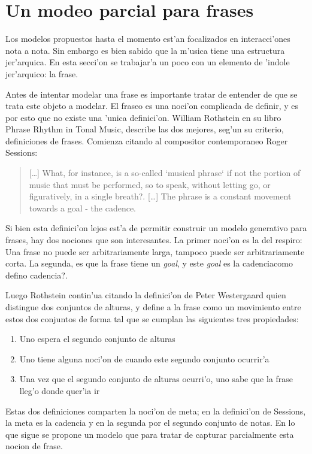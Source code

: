 \section{Un modeo parcial para frases}
\label{sec:phrases}
Los modelos propuestos hasta el momento est'an focalizados en interacci'ones nota a nota. Sin embargo es bien sabido que la m'usica
tiene una estructura jer'arquica. En esta secci'on se trabajar'a un poco con un elemento de 'indole jer'arquico: la frase. 

Antes de intentar modelar una frase es importante tratar de entender de que se trata este objeto a modelar. El fraseo es una
noci'on complicada de definir, y es por esto que no existe una 'unica definici'on. William Rothstein en su libro Phrase Rhythm 
in Tonal Music, describe las dos mejores, seg'un su criterio, definiciones de frases. Comienza citando al compositor contemporaneo
Roger Sessions: 

\begin{quote} 
[\ldots] What, for instance, is a so-called `musical phrase` if not the portion of music that must be performed, so to speak, 
without letting go, or figuratively, in a single breath?. [\ldots] The phrase is a constant movement towards a goal - the cadence.
\end{quote}

Si bien esta definici'on lejos est'a de permitir construir un modelo generativo para frases, hay dos nociones que son interesantes. 
La primer noci'on es la del respiro: Una frase no puede ser arbitrariamente larga, tampoco puede ser arbitrariamente corta. La 
segunda, es que la frase tiene un \emph{goal}, y este \emph{goal} es la cadencia\alert{como defino cadencia?}. 

Luego Rothstein contin'ua citando la definici'on de Peter Westergaard quien distingue dos conjuntos de alturas, y define
a la frase como un movimiento entre estos dos conjuntos de forma tal que se cumplan las siguientes tres propiedades:
\begin{enumerate}
 \item Uno espera el segundo conjunto de alturas
 \item Uno tiene alguna noci'on de cuando este segundo conjunto ocurrir'a
 \item Una vez que el segundo conjunto de alturas ocurri'o, uno sabe que la frase lleg'o donde quer'ia ir
\end{enumerate}


Estas dos definiciones comparten la noci'on de meta; en la definici'on de Sessions, la meta es la cadencia y en la segunda
por el segundo conjunto de notas.  En lo que sigue se propone un modelo que para tratar de capturar parcialmente esta nocion de frase.

